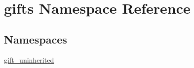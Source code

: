 \hypertarget{namespacegifts}{}\section{gifts Namespace Reference}
\label{namespacegifts}
\subsection*{Namespaces}
\begin{DoxyCompactItemize}
\item 
 \hyperlink{namespacegifts_1_1gift__uninherited}{gift\+\_\+uninherited}
\end{DoxyCompactItemize}
